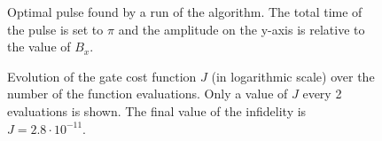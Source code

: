 \documentclass[../main/main.tex]{subfiles}
\begin{document}
\begin{figure}[ht]
    \begin{minipage}[t]{.45\textwidth}
        \centering
        \vspace{-0.5cm}
        \caption{Optimal pulse found by a run of the algorithm. The total time of the pulse is set to $\pi$ and the amplitude on the y-axis is relative to the value of $B_x$.}
        \label{fig:NOT_pulse}
    \end{minipage}
    \hfill
    \begin{minipage}[t]{.45\textwidth}
        \centering
        \vspace{-0.5cm}
        \caption{Evolution of the gate cost function $J$ (in logarithmic scale) over the number of the function evaluations. Only a value of $J$ every 2 evaluations is shown. The final value of the infidelity is \mbox{$J=2.8 \cdot 10^{-11}$}.}
        \label{fig:NOT_evolutionJ}
    \end{minipage}
\end{figure}
\end{document}
